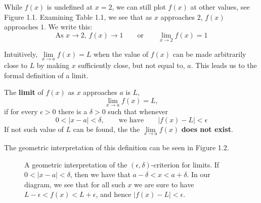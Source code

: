 While $f(x)$ is undefined at $x = 2$, we can still plot $f(x)$ at other values, see Figure 1.1. Examining Table 1.1, we see that as $x$ approaches $2$, $f(x)$ approaches $1$. We write this:
$$\text{As  } x \to 2\text{,  }f(x) \to 1
\qquad\text{or}\qquad
\lim_{x\to 2} f(x) = 1$$

Intuitively, $\displaystyle\lim\limits_{x\to a} f(x) = L$ when the value of $f(x)$ can be made arbitrarily close to $L$ by making $x$ sufficiently close, but not equal to, $a$. This leads us to the formal definition of a limit.


\begin{definition}[Limit]
	The \textbf{limit} of $f(x)$ as $x$ approaches $a$ is $L$,
	$$\lim_{x\to a} f(x) = L,$$
	if for every $\epsilon > 0$ there is a $\delta > 0$ such that whenever
	$$0 < |x-a| < \delta,
	\qquad\text{we have}\qquad
	|f(x) - L| < \epsilon$$
	If not such value of $L$ can be found, the the $\displaystyle\lim\limits_{x\to a} f(x)$
    \textbf{does not exist}.  
    \\\cite{mooc}
\end{definition}

The geometric interpretation of this definition can be seen in 
Figure 1.2.

\begin{figure}[H]
	\centering
	\caption{A geometric interpretation of the
	  $(\epsilon,\delta)$-criterion for limits.  If $0<|x-a|<\delta$, then we have that $a
	  -\delta < x < a+\delta$. In our diagram, we see that for all such
	  $x$ we are sure to have $L - \epsilon< f(x) < L+\epsilon$, and hence
	  $|f(x) - L|<\epsilon$. \cite{mooc}}
	\label{figure:epsilon-delta}
\end{figure}

